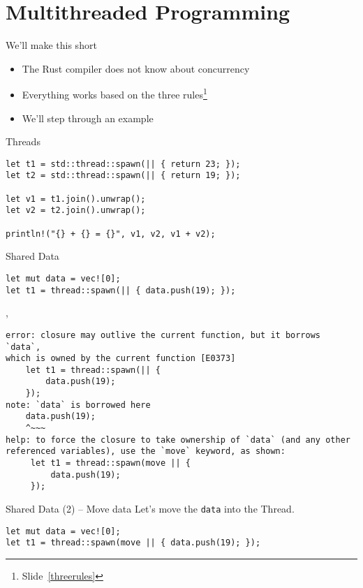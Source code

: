 \section{Multithreaded Programming}

\begin{frame}{We'll make this short}
\begin{itemize}
  \item The Rust compiler does not know about concurrency
  \item Everything works based on the three rules\footnote{Slide~\ref{threerules}}
  \item We'll step through an example
\end{itemize}
\end{frame}

\begin{frame}[fragile]{Threads}
\begin{verbatim}
let t1 = std::thread::spawn(|| { return 23; });
let t2 = std::thread::spawn(|| { return 19; });

let v1 = t1.join().unwrap();
let v2 = t2.join().unwrap();

println!("{} + {} = {}", v1, v2, v1 + v2);
\end{verbatim}
\end{frame}

\begin{frame}[fragile]{Shared Data}
\begin{verbatim}
let mut data = vec![0];
let t1 = thread::spawn(|| { data.push(19); });
\end{verbatim}
\sep
\begin{verbatim}
error: closure may outlive the current function, but it borrows `data`,
which is owned by the current function [E0373]
    let t1 = thread::spawn(|| {
        data.push(19);
    });
note: `data` is borrowed here
    data.push(19);
    ^~~~
help: to force the closure to take ownership of `data` (and any other
referenced variables), use the `move` keyword, as shown:
     let t1 = thread::spawn(move || {
         data.push(19);
     });
\end{verbatim}
\end{frame}

\begin{frame}[fragile]{Shared Data (2) -- Move data}
Let's move the \texttt{data} into the Thread.
\begin{verbatim}
let mut data = vec![0];
let t1 = thread::spawn(move || { data.push(19); });
\end{verbatim}
\end{frame}

